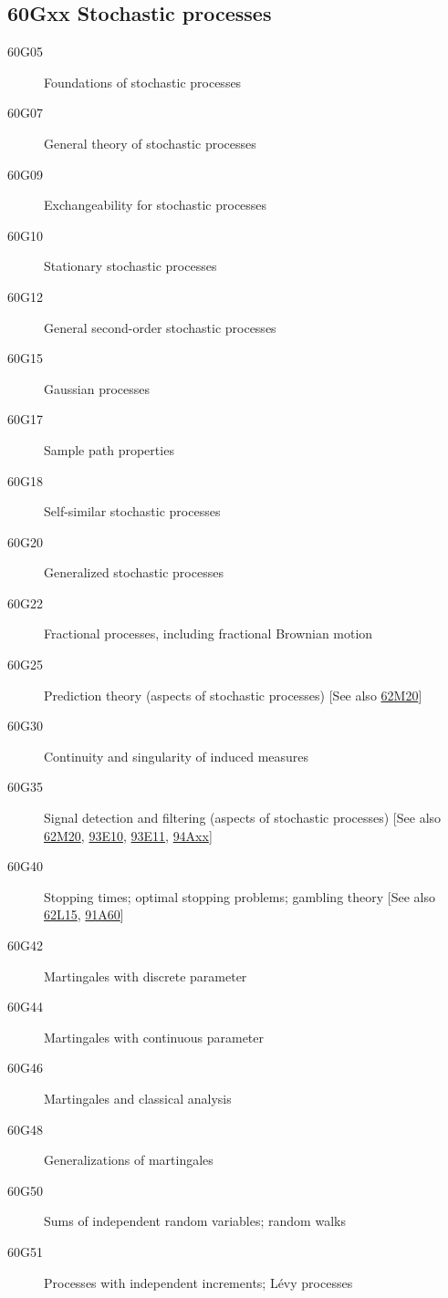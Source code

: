 \subsection*{60Gxx  Stochastic processes }\label{60Gxx}
\begin{description}  
\item [60G05]\label{60G05} Foundations of stochastic processes
\item [60G07]\label{60G07} General theory of stochastic processes
\item [60G09]\label{60G09} Exchangeability for stochastic processes
\item [60G10]\label{60G10} Stationary stochastic processes
\item [60G12]\label{60G12} General second-order stochastic processes
\item [60G15]\label{60G15} Gaussian processes
\item [60G17]\label{60G17} Sample path properties
\item [60G18]\label{60G18} Self-similar stochastic processes
\item [60G20]\label{60G20} Generalized stochastic processes
\item [60G22]\label{60G22} Fractional processes, including fractional Brownian motion
\item [60G25]\label{60G25} Prediction theory (aspects of stochastic processes) [See also \hyperref[62M20]{62M20}]
\item [60G30]\label{60G30} Continuity and singularity of induced measures
\item [60G35]\label{60G35} Signal detection and filtering (aspects of stochastic processes) [See also \hyperref[62M20]{62M20}, \hyperref[93E10]{93E10}, \hyperref[93E11]{93E11}, \hyperref[94Axx]{94Axx}]
\item [60G40]\label{60G40} Stopping times; optimal stopping problems; gambling theory [See also \hyperref[62L15]{62L15}, \hyperref[91A60]{91A60}]
\item [60G42]\label{60G42} Martingales with discrete parameter
\item [60G44]\label{60G44} Martingales with continuous parameter
\item [60G46]\label{60G46} Martingales and classical analysis
\item [60G48]\label{60G48} Generalizations of martingales
\item [60G50]\label{60G50} Sums of independent random variables; random walks
\item [60G51]\label{60G51} Processes with independent increments; L\'{e}vy processes

\end{description}
